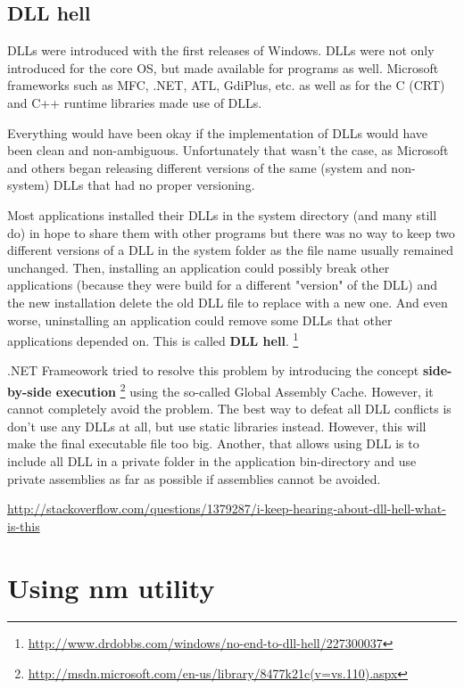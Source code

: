 \subsection{DLL hell}
\label{sec:DLL_hell}

DLLs were introduced with the first releases of Windows.
DLLs were not only introduced for the core OS, but made available for programs
as well. Microsoft frameworks such as MFC, .NET, ATL, GdiPlus, etc. as well as
for the C (CRT) and C++ runtime libraries made use of DLLs.

Everything would have been okay if the implementation of DLLs would have been
clean and non-ambiguous. Unfortunately that wasn't the case, as Microsoft and
others began releasing different versions of the same (system and non-system)
DLLs that had no proper versioning.

Most applications installed their DLLs in the system directory (and many still
do) in hope to share them with other programs but there was no way to keep two
different versions of a DLL in the system folder as the file name usually
remained unchanged. Then, installing an application could possibly break other
applications (because they were build for a different "version" of the DLL) and
the new installation delete the old DLL file to replace with a new one.
And even worse, uninstalling an application could remove some DLLs that other
 applications depended on. This is called {\bf DLL
hell}.
\footnote{\url{http://www.drdobbs.com/windows/no-end-to-dll-hell/227300037}}

.NET Frameowork tried to resolve this problem by introducing the concept
{\bf side-by-side execution}
\footnote{\url{http://msdn.microsoft.com/en-us/library/8477k21c(v=vs.110).aspx}}
using the so-called Global Assembly Cache.
However, it cannot completely avoid the problem.
The best way to defeat all DLL conflicts is don't use any DLLs at all, but use
static libraries instead. However, this will make the final executable file too
big. Another, that allows using DLL is to include all DLL in a private folder in
the application bin-directory and use private assemblies as far as possible if
assemblies cannot be avoided.

\url{http://stackoverflow.com/questions/1379287/i-keep-hearing-about-dll-hell-what-is-this}

\section{Using nm utility}
\label{sec:using-nm-utility}


